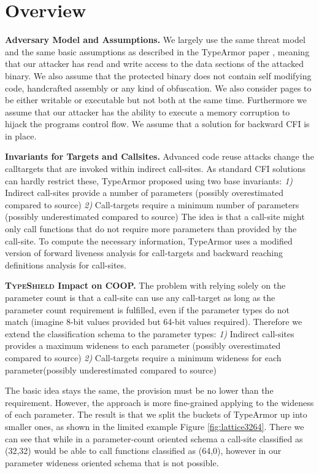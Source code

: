 \section{Overview}
\label{chapter:TypeShild Overview}

\textbf{Adversary Model and Assumptions.}
\label{Adversary Model}
We largely use the same threat model and the same basic assumptions as described in the TypeArmor 
paper \cite{veen:typearmor}, meaning that our attacker has read and write access to the data 
sections of the attacked binary.  We also assume that the protected binary does not contain 
self modifying code, handcrafted assembly or any kind of obfuscation. We also consider pages 
to be either writable or executable but not both at the same time. Furthermore we assume 
that our attacker has the ability to execute a memory corruption to hijack the programs 
control flow. We assume that a solution for backward CFI is in place.

\textbf{Invariants for Targets and Callsites.}
\label{Invariants for Targets and Callsites}
Advanced code reuse attacks change the calltargets that are invoked within indirect 
call-sites. As standard CFI solutions can hardly restrict these, TypeArmor proposed using two base invariants:
\textit{1)} Indirect call-sites provide a number of parameters (possibly overestimated compared to source)
\textit{2)} Call-targets require a minimum number of parameters (possibly underestimated compared to source)
The idea is that a call-site might only call functions that do not require more parameters than provided by the call-site. 
To compute the necessary information, TypeArmor uses a modified version of forward liveness analysis for call-targets and 
backward reaching definitions analysis for call-sites.

\textbf{\textsc{TypeShield} Impact on COOP.}
\label{TypeShild Impact on COOP}
The problem with relying solely on the parameter count is that a call-site can use any call-target as long as the parameter count 
requirement is fulfilled, even if the parameter types do not match (imagine 8-bit values provided but 64-bit values required). 
Therefore we extend the classification schema to the parameter types:
\textit{1)} Indirect call-sites provides a maximum wideness to each parameter (possibly overestimated compared to source)
\textit{2)} Call-targets require a minimum wideness for each parameter(possibly underestimated compared to source)

The basic idea stays the same, the provision must be no lower than the requirement. However, the approach is more fine-grained 
applying to the wideness of each parameter. The result is that we split the buckets of TypeArmor up into smaller ones, 
as shown in the limited example Figure \ref{fig:lattice3264}. There we can see that while in a parameter-count oriented
schema a call-site classified as (32,32) would be able to call functions classified as (64,0), however
in our parameter wideness oriented schema that is not possible.

